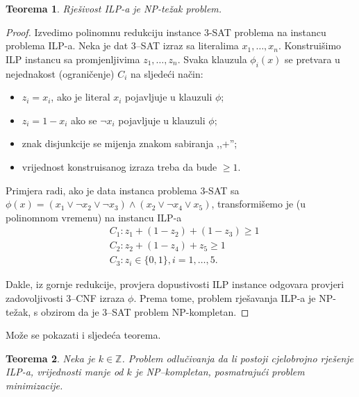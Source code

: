 \documentclass[a4paper, utf8, 11pt, colorlinks]{book}
\newtheorem{thm}{Teorema}[chapter]
\theoremstyle{definition}
\begin{document}
   \begin{thm}
   	  Rješivost ILP-a je NP-težak problem.
   \end{thm}
   \begin{proof}
   	   Izvedimo polinomnu redukciju instance 3-SAT problema na instancu problema ILP-a. Neka je dat 3--SAT izraz sa literalima  
   	   $x_1,\ldots, x_n$.  Konstruišimo ILP instancu sa promjenljivima $z_1, \ldots, z_n$.
   	   Svaka klauzula $\phi_i(x)$ se pretvara u nejednakost (ograničenje)  $C_i$ na sljedeći način:
   	   \begin{itemize}
   	   	\item $z_i = x_i$, ako je literal $x_i$ pojavljuje u klauzuli $\phi$; 
   	   	\item $z_i = 1 - x_i$ ako se $\neg x_i$ pojavljuje u klauzuli $\phi$;
   	   	\item znak disjunkcije se mijenja znakom sabiranja ,,+'';
   	   	\item vrijednost konstruisanog izraza treba da bude $\geq 1$. 
   	   \end{itemize}
   	   	       Primjera radi, ako je data instanca problema 3-SAT sa 
   	   	      $\phi(x) = (x_1 \vee \neg x_2 \vee \neg x_3) \wedge ( x_2 \vee \neg x_4 \vee x_5 )$, transformišemo je (u polinomnom vremenu) na instancu ILP-a
   	   	      \begin{align*}
   	   	         	 &C_1: z_1 + (1- z_2) + (1 - z_3 ) \geq 1 \\
   	   	         	 &C_2: z_2 + (1-z_4)  + z_5 \geq 1 \\
   	   	         	 &C_3: z_i \in \{0,1\}, i=1,\ldots,5.
   	   	      \end{align*} 

   	   Dakle, iz gornje redukcije,  provjera dopustivosti ILP instance odgovara provjeri zadovoljivosti 3--CNF izraza $\phi$.   Prema tome, problem rješavanja ILP-a je NP-težak, s obzirom da je 3--SAT problem NP-kompletan. 
   \end{proof} 
 Može se pokazati i sljedeća teorema.
 \begin{thm} Neka je $k\in \mathbb{Z}$.
 	 Problem odlučivanja da li postoji cjelobrojno rješenje  ILP-a,  vrijednosti manje od $k$ je NP--kompletan, posmatrajući problem minimizacije. 
 \end{thm}
 
\end{document}
